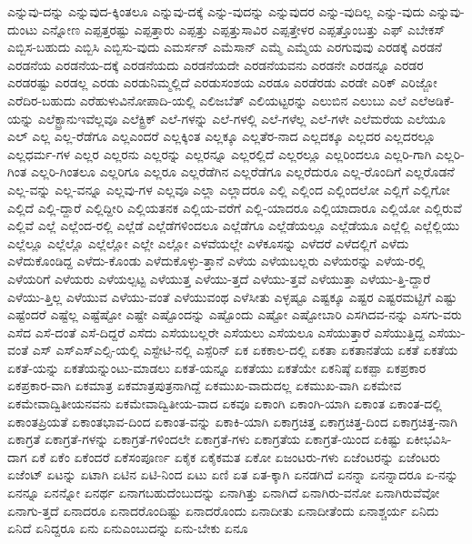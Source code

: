 {ಎನ್ನುವು-ದನ್ನು
ಎನ್ನುವುದ-ಕ್ಕಿಂತಲೂ
ಎನ್ನುವು-ದಕ್ಕೆ
ಎನ್ನು-ವುದನ್ನು
ಎನ್ನುವುದರ
ಎನ್ನು-ವುದಿಲ್ಲ
ಎನ್ನು-ವುದು
ಎನ್ನುವು-ದುಂಟು
ಎನ್ನೋಣ
ಎಪ್ಪತ್ತರಷ್ಟು
ಎಪ್ಪತ್ತಾರು
ಎಪ್ಪತ್ತು
ಎಪ್ಪತ್ತುಸಾವಿರ
ಎಪ್ಪತ್ತೇಳರ
ಎಪ್ಪತ್ತೊಂಬತ್ತು
ಎಫ್
ಎಬೇಕಸ್
ಎಬ್ಬಿಸ-ಬಹುದು
ಎಬ್ಬಿಸಿ
ಎಬ್ಬಿಸು-ವುದು
ಎಮರ್ಸನ್
ಎಮೆಸಾನ್
ಎಮ್ಮೆ
ಎಮ್ಮೆಯ
ಎರಗುವುವು
ಎರಡಕ್ಕೆ
ಎರಡನೆ
ಎರಡನೆಯ
ಎರಡನೆಯ-ದಕ್ಕೆ
ಎರಡನೆಯದು
ಎರಡನೆಯದೇ
ಎರಡನೆಯವನು
ಎರಡನೇ
ಎರಡನ್ನೂ
ಎರಡರ
ಎರಡರಷ್ಟು
ಎರಡಲ್ಲ
ಎರಡು
ಎರಡುನಿಮ್ಮಲ್ಲಿದೆ
ಎರಡುಸಂಶಯ
ಎರಡೂ
ಎರಡೆರಡು
ಎರಡೇ
ಎರಿಕ್
ಎರಿಜ್ಜೋ
ಎರೆದಿರ-ಬಹುದು
ಎರೆಹುಳುವಿನೋಪಾದಿ-ಯಲ್ಲಿ
ಎಲಿಜಬೆತ್
ಎಲಿಯಟ್ಟರನ್ನು
ಎಲುಬಿನ
ಎಲುಬು
ಎಲೆ
ಎಲೆಅಡಿಕೆ-ಯನ್ನು
ಎಲೆಕ್ಟ್ರಾನುಇವೆಲ್ಲವೂ
ಎಲೆಕ್ಟ್ರಿಕ್
ಎಲೆ-ಗಳನ್ನು
ಎಲೆ-ಗಳಲ್ಲಿ
ಎಲೆ-ಗಳೆಲ್ಲ
ಎಲೆ-ಗಳೇ
ಎಲೆಮರೆಯ
ಎಲೆಯೂ
ಎಲ್
ಎಲ್ಲ
ಎಲ್ಲ-ರೆಡೆಗೂ
ಎಲ್ಲಎಂದರೆ
ಎಲ್ಲಕ್ಕಿಂತ
ಎಲ್ಲಕ್ಕೂ
ಎಲ್ಲತೆರ-ನಾದ
ಎಲ್ಲದಕ್ಕೂ
ಎಲ್ಲದರ
ಎಲ್ಲದರಲ್ಲೂ
ಎಲ್ಲಧರ್ಮ-ಗಳ
ಎಲ್ಲರ
ಎಲ್ಲರನು
ಎಲ್ಲರನ್ನು
ಎಲ್ಲರನ್ನೂ
ಎಲ್ಲರಲ್ಲಿದೆ
ಎಲ್ಲರಲ್ಲೂ
ಎಲ್ಲರಿಂದಲೂ
ಎಲ್ಲರಿ-ಗಾಗಿ
ಎಲ್ಲರಿ-ಗಿಂತ
ಎಲ್ಲರಿ-ಗಿಂತಲೂ
ಎಲ್ಲರಿಗೂ
ಎಲ್ಲರೂ
ಎಲ್ಲರೆಡೆಗಿನ
ಎಲ್ಲರೆಡೆಗೂ
ಎಲ್ಲರೆದುರೂ
ಎಲ್ಲ-ರೊಂದಿಗೆ
ಎಲ್ಲರೊಡನೆ
ಎಲ್ಲ-ವನ್ನು
ಎಲ್ಲ-ವನ್ನೂ
ಎಲ್ಲವು-ಗಳ
ಎಲ್ಲವೂ
ಎಲ್ಲಾ
ಎಲ್ಲಾದರೂ
ಎಲ್ಲಿ
ಎಲ್ಲಿಂದ
ಎಲ್ಲಿಂದಲೋ
ಎಲ್ಲಿಗೆ
ಎಲ್ಲಿಗೋ
ಎಲ್ಲಿದೆ
ಎಲ್ಲಿ-ದ್ದಾರೆ
ಎಲ್ಲಿದ್ದೀರಿ
ಎಲ್ಲಿಯತನಕ
ಎಲ್ಲಿಯ-ವರೆಗೆ
ಎಲ್ಲಿ-ಯಾದರೂ
ಎಲ್ಲಿಯಾದಾರೂ
ಎಲ್ಲಿಯೋ
ಎಲ್ಲಿರುವೆ
ಎಲ್ಲಿವೆ
ಎಲ್ಲೆ
ಎಲ್ಲೆಂದ-ರಲ್ಲಿ
ಎಲ್ಲೆಡೆ
ಎಲ್ಲೆಡೆಗಳಿಂದಲೂ
ಎಲ್ಲೆಡೆಗೂ
ಎಲ್ಲೆಡೆಯಲ್ಲೂ
ಎಲ್ಲೆಡೆಯೂ
ಎಲ್ಲೆಲ್ಲಿ
ಎಲ್ಲೆಲ್ಲಿಯು
ಎಲ್ಲೆಲ್ಲೂ
ಎಲ್ಲೆಲ್ಲೊ
ಎಲ್ಲೆಲ್ಲೋ
ಎಲ್ಲೇ
ಎಲ್ಲೋ
ಎಳವೆಯಲ್ಲೇ
ಎಳೆಕೂಸನ್ನು
ಎಳೆದರೆ
ಎಳೆದಲ್ಲಿಗೆ
ಎಳೆದು
ಎಳೆದುಕೊಂಡಿದ್ದ
ಎಳೆದು-ಕೊಂಡು
ಎಳೆದುಕೊಳ್ಳು-ತ್ತಾನೆ
ಎಳೆಯ
ಎಳೆಯಬಲ್ಲರು
ಎಳೆಯರನ್ನು
ಎಳೆಯ-ರಲ್ಲಿ
ಎಳೆಯರಿಗೆ
ಎಳೆಯರು
ಎಳೆಯಲ್ಪಟ್ಟ
ಎಳೆಯುತ್ತ
ಎಳೆಯು-ತ್ತದೆ
ಎಳೆಯು-ತ್ತವೆ
ಎಳೆಯುತ್ತಾ
ಎಳೆಯು-ತ್ತಿ-ದ್ದಾರೆ
ಎಳೆಯು-ತ್ತಿಲ್ಲ
ಎಳೆಯುವ
ಎಳೆಯು-ವಂತೆ
ಎಳೆಯುವಂಥ
ಎಳೆಸೀತು
ಎಳ್ಳಷ್ಟೂ
ಎಷ್ಟಕ್ಕೂ
ಎಷ್ಟರ
ಎಷ್ಟರಮಟ್ಟಿಗೆ
ಎಷ್ಟು
ಎಷ್ಟೆಂದರೆ
ಎಷ್ಟೆಲ್ಲ
ಎಷ್ಟೆಷ್ಟೋ
ಎಷ್ಟೇ
ಎಷ್ಟೊಂದನ್ನು
ಎಷ್ಟೊಂದು
ಎಷ್ಟೋ
ಎಷ್ಟೋಬಾರಿ
ಎಸಗಿದವ-ನನ್ನು
ಎಸಗು-ವರು
ಎಸೆದ
ಎಸೆ-ದಂತೆ
ಎಸೆ-ದಿದ್ದರೆ
ಎಸೆದು
ಎಸೆಯಬಲ್ಲರೇ
ಎಸೆಯಲು
ಎಸೆಯಲೂ
ಎಸೆಯುತ್ತಾರೆ
ಎಸೆಯುತ್ತಿದ್ದ
ಎಸೆಯು-ವಂತೆ
ಎಸ್
ಎಸ್ಎಸ್ಎಲ್ಸಿ-ಯಲ್ಲಿ
ಎಸ್ಟೇಟಿ-ನಲ್ಲಿ
ಎಸ್ಪೆರಿನ್
ಏಕ
ಏಕಕಾಲ-ದಲ್ಲಿ
ಏಕತಾ
ಏಕತಾನತೆಯ
ಏಕತೆ
ಏಕತೆಯ
ಏಕತೆ-ಯನ್ನು
ಏಕತೆಯನ್ನುಂಟು-ಮಾಡಲು
ಏಕತೆ-ಯನ್ನೂ
ಏಕತೆಯು
ಏಕತೆಯೇ
ಏಕನಿಷ್ಠೆ
ಏಕಪ್ಪಾ
ಏಕಪ್ರಕಾರ
ಏಕಪ್ರಕಾರ-ವಾಗಿ
ಏಕಮಾತ್ರ
ಏಕಮಾತ್ರಪುತ್ರನಾಗಿದ್ದೆ
ಏಕಮುಖ-ವಾದುದಲ್ಲ
ಏಕಮುಖ-ವಾಗಿ
ಏಕಮೇವ
ಏಕಮೇವಾದ್ವಿತೀಯನವನು
ಏಕಮೇವಾದ್ವಿತೀಯ-ವಾದ
ಏಕವೂ
ಏಕಾಂಗಿ
ಏಕಾಂಗಿ-ಯಾಗಿ
ಏಕಾಂತ
ಏಕಾಂತ-ದಲ್ಲಿ
ಏಕಾಂತಪ್ರಿಯತೆ
ಏಕಾಂತಭಾವ-ದಿಂದ
ಏಕಾಂತ-ವನ್ನು
ಏಕಾಕಿ-ಯಾಗಿ
ಏಕಾಗ್ರಚಿತ್ತ
ಏಕಾಗ್ರಚಿತ್ತ-ದಿಂದ
ಏಕಾಗ್ರಚಿತ್ತ-ನಾಗಿ
ಏಕಾಗ್ರತೆ
ಏಕಾಗ್ರತೆ-ಗಳನ್ನು
ಏಕಾಗ್ರತೆ-ಗಳಿಂದಲೇ
ಏಕಾಗ್ರತೆ-ಗಳು
ಏಕಾಗ್ರತೆಯ
ಏಕಾಗ್ರತೆ-ಯಿಂದ
ಏಕಿಷ್ಟು
ಏಕೀಭವಿಸಿ-ದಾಗ
ಏಕೆ
ಏಕೆಂ
ಏಕೆಂದರೆ
ಏಕೆಸಂಪೂರ್ಣ
ಏಕೈಕ
ಏಕೈಕಮತ
ಏಕೋ
ಏಜಂಟರು-ಗಳು
ಏಜೆಂಟರನ್ನು
ಏಜೆಂಟರು
ಏಜೆಂಟ್
ಏಟನ್ನು
ಏಟಾಗಿ
ಏಟಿನ
ಏಟಿ-ನಿಂದ
ಏಟು
ಏಣಿ
ಏತ
ಏತ-ಕ್ಕಾಗಿ
ಏನಡಗಿದೆ
ಏನನ್ನಾ
ಏನನ್ನಾದರೂ
ಏ-ನನ್ನು
ಏನನ್ನೂ
ಏನನ್ನೋ
ಏನರ್ಥ
ಏನಾಗಬಹುದೆಂಬುದನ್ನು
ಏನಾಗಿತ್ತು
ಏನಾಗಿದೆ
ಏನಾಗಿರು-ವನೋ
ಏನಾಗಿರುವೆವೋ
ಏನಾಗು-ತ್ತದೆ
ಏನಾದರೂ
ಏನಾದರೊಂದಿಷ್ಟು
ಏನಾದರೊಂದು
ಏನಾದೀತು
ಏನಾದೀತೆಂದು
ಏನಾಶ್ಚರ್ಯ
ಏನಿದು
ಏನಿದೆ
ಏನಿದ್ದರೂ
ಏನು
ಏನುಎಂಬುದನ್ನು
ಏನು-ಬೇಕು
ಏನೂ
}
